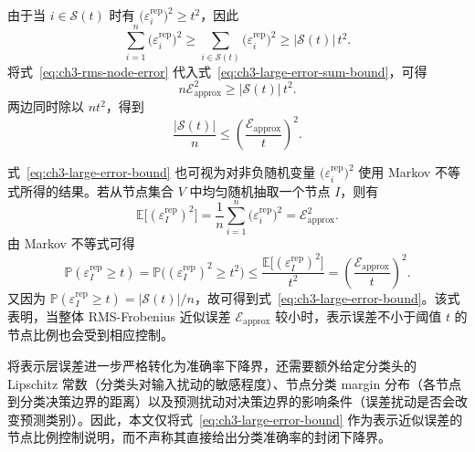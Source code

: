 由于当 $i\in\mathcal{S}(t)$ 时有 $\bigl(\varepsilon_i^{\mathrm{rep}}\bigr)^2\geq t^2$，因此
\begin{equation}
  \sum_{i=1}^{n}\bigl(\varepsilon_i^{\mathrm{rep}}\bigr)^2
  \geq
  \sum_{i\in\mathcal{S}(t)}\bigl(\varepsilon_i^{\mathrm{rep}}\bigr)^2
  \geq
  |\mathcal{S}(t)|\,t^2.
  \label{eq:ch3-large-error-sum-bound}
\end{equation}
将式~\eqref{eq:ch3-rms-node-error} 代入式~\eqref{eq:ch3-large-error-sum-bound}，可得
\begin{equation}
  n\mathcal{E}_{\mathrm{approx}}^2
  \geq
  |\mathcal{S}(t)|\,t^2.
  \label{eq:ch3-large-error-intermediate}
\end{equation}
两边同时除以 $nt^2$，得到
\begin{equation}
  \frac{|\mathcal{S}(t)|}{n}
  \leq
  \left(\frac{\mathcal{E}_{\mathrm{approx}}}{t}\right)^2.
  \label{eq:ch3-large-error-bound}
\end{equation}

式~\eqref{eq:ch3-large-error-bound} 也可视为对非负随机变量 $\bigl(\varepsilon_i^{\mathrm{rep}}\bigr)^2$ 使用 Markov 不等式所得的结果。若从节点集合 $V$ 中均匀随机抽取一个节点 $I$，则有
\begin{equation}
  \mathbb{E}\bigl[(\varepsilon_I^{\mathrm{rep}})^2\bigr]
  =
  \frac{1}{n}\sum_{i=1}^{n}\bigl(\varepsilon_i^{\mathrm{rep}}\bigr)^2
  =
  \mathcal{E}_{\mathrm{approx}}^2.
  \label{eq:ch3-markov-expectation}
\end{equation}
由 Markov 不等式可得
\begin{equation}
  \mathbb{P}(\varepsilon_I^{\mathrm{rep}}\geq t)
  =
  \mathbb{P}\bigl((\varepsilon_I^{\mathrm{rep}})^2\geq t^2\bigr)
  \leq
  \frac{\mathbb{E}\bigl[(\varepsilon_I^{\mathrm{rep}})^2\bigr]}{t^2}
  =
  \left(\frac{\mathcal{E}_{\mathrm{approx}}}{t}\right)^2.
  \label{eq:ch3-markov-derivation}
\end{equation}
又因为 $\mathbb{P}(\varepsilon_I^{\mathrm{rep}}\geq t)=|\mathcal{S}(t)|/n$，故可得到式~\eqref{eq:ch3-large-error-bound}。该式表明，当整体 RMS-Frobenius 近似误差 $\mathcal{E}_{\mathrm{approx}}$ 较小时，表示误差不小于阈值 $t$ 的节点比例也会受到相应控制。

将表示层误差进一步严格转化为准确率下降界，还需要额外给定分类头的 Lipschitz 常数（分类头对输入扰动的敏感程度）、节点分类 margin 分布（各节点到分类决策边界的距离）以及预测扰动对决策边界的影响条件（误差扰动是否会改变预测类别）。因此，本文仅将式~\eqref{eq:ch3-large-error-bound} 作为表示近似误差的节点比例控制说明，而不声称其直接给出分类准确率的封闭下降界。

